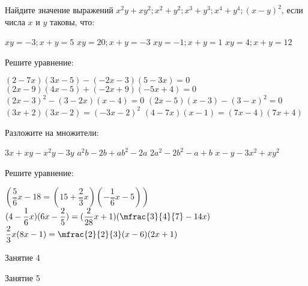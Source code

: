 \begin{class}[number=4]
	\begin{listofex}
		\item Найдите значение выражений \(x^2y+xy^2; x^2 + y^2; x^3 + y^3; x^4 + y^4; (x-y)^2\), если числа \(x\) и \(y\) таковы, что:
		\begin{itasks}[2]
			\task \(xy=-3; x+y=5\)
			\task \(xy=20; x+y=-3\)
			\task \(xy=-1; x+y=1\)
			\task \(xy=4; x+y=12\)
		\end{itasks}
		\item Решите уравнение:
		\begin{itasks}[1]
			\task \( (2-7x)(3x-5)-(-2x-3)(5-3x)=0 \)
			\task \( (2x-9)(4x-5)+(-2x+9)(-5x+4)=0 \)
			\task \( (2x-3)^2-(3-2x)(x-4)=0 \)
			\task \( (2x-5)(x-3)-(3-x)^2=0 \)
			\task \( (3x+2)(3x-2)=(-3x-2)^2 \)
			\task \( (4-7x)(x-1)=(7x-4)(7x+4) \)
		\end{itasks}
		\item Разложите на множители:
		\begin{itasks}[1]
			\task \(3x+xy-x^2y-3y\)
			\task \(a^2b-2b+ab^2-2a\)
			\task \(2a^2-2b^2-a+b\)
			\task \(x-y-3x^2+xy^2\)
		\end{itasks}
		\item Решите уравнение:
		\begin{itasks}[1]
			\task \( (\dfrac{5}{6}x-18=(15+\dfrac{2}{3}x)(-\dfrac{1}{6}x-5)) \)
			\task \( (4-\dfrac{1}{6}x)(6x-\dfrac{2}{5})=(\dfrac{2}{28}x+1)(\mfrac{3}{4}{7}-14x) \)
			\task \( \dfrac{2}{3}x(8x-1)=\mfrac{2}{2}{3}(x-6)(2x+1) \)
		\end{itasks}
	\end{listofex}
\end{class}

\begin{class}[number=4]
	\begin{listofex}
		\item Занятие 4
	\end{listofex}
\end{class}

\begin{class}[number=5]
	\begin{listofex}
		\item Занятие 5
	\end{listofex}
\end{class}

